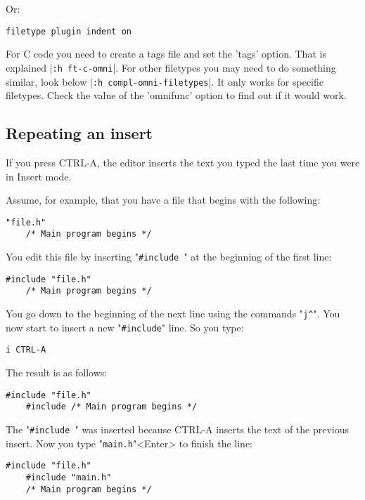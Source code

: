 Or:

\begin{Verbatim}[samepage=true]
 filetype plugin indent on
\end{Verbatim}

For C code you need to create a tags file and set the 'tags' option.
That is explained |\verb!:h ft-c-omni!|.
For other filetypes you may need to do something similar, look below |\verb!:h compl-omni-filetypes!|.
It only works for specific filetypes.
Check the value of the 'omnifunc' option to find out if it would work.
\subsection{Repeating an insert}
If you press CTRL-A, the editor inserts the text you typed the last time you were in Insert mode.

Assume, for example, that you have a file that begins with the following:

\begin{Verbatim}[samepage=true]
    "file.h" 
    /* Main program begins */ 
\end{Verbatim}

You edit this file by inserting "\verb!#include !" at the beginning of the first line:

\begin{Verbatim}[samepage=true]
    #include "file.h" 
    /* Main program begins */ 
\end{Verbatim}

You go down to the beginning of the next line using the commands "\verb!j^!".
You now start to insert a new "\verb!#include!" line.
So you type:

\begin{Verbatim}[samepage=true]
 i CTRL-A
\end{Verbatim}

The result is as follows:

\begin{Verbatim}[samepage=true]
    #include "file.h" 
    #include /* Main program begins */ 
\end{Verbatim}

The "\verb!#include !" was inserted because CTRL-A inserts the text of the previous insert.
Now you type  "\verb!main.h!"<Enter>  to finish the line:


\begin{Verbatim}[samepage=true]
    #include "file.h" 
    #include "main.h" 
    /* Main program begins */ 
\end{Verbatim}


